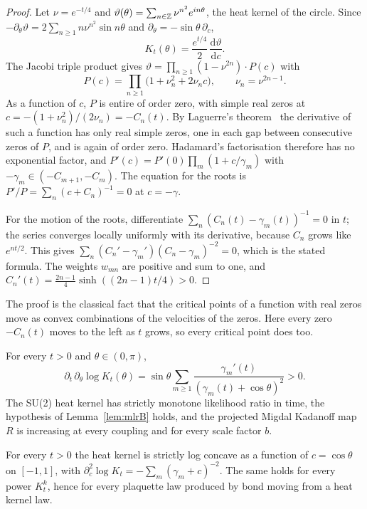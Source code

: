 \begin{proof}
Let $\nu=e^{-t/4}$ and $\vartheta(\theta)=\sum_{n\in\mathbb{Z}}\nu^{n^2}e^{in\theta}$, the heat kernel of the circle. Since $-\partial_\theta\vartheta=2\sum_{n\ge1}n\nu^{n^2}\sin n\theta$ and $\partial_\theta=-\sin\theta\,\partial_c$,
\[
K_t(\theta)=\frac{e^{t/4}}{2}\,\frac{\mathrm d\vartheta}{\mathrm dc}.
\]
The Jacobi triple product gives $\vartheta=\prod_{n\ge1}(1-\nu^{2n})\cdot P(c)$ with
\[
P(c)=\prod_{n\ge1}\big(1+\nu_n^2+2\nu_nc\big),\qquad \nu_n=\nu^{2n-1}.
\]
As a function of $c$, $P$ is entire of order zero, with simple real zeros at $c=-(1+\nu_n^2)/(2\nu_n)=-C_n(t)$. By Laguerre's theorem~\cite{PS14} the derivative of such a function has only real simple zeros, one in each gap between consecutive zeros of $P$, and is again of order zero. Hadamard's factorisation therefore has no exponential factor, and $P'(c)=P'(0)\prod_m(1+c/\gamma_m)$ with $-\gamma_m\in(-C_{m+1},-C_m)$. The equation for the roots is $P'/P=\sum_n(c+C_n)^{-1}=0$ at $c=-\gamma$.

For the motion of the roots, differentiate $\sum_n(C_n(t)-\gamma_m(t))^{-1}=0$ in $t$; the series converges locally uniformly with its derivative, because $C_n$ grows like $e^{nt/2}$. This gives $\sum_n(C_n'-\gamma_m')(C_n-\gamma_m)^{-2}=0$, which is the stated formula. The weights $w_{mn}$ are positive and sum to one, and $C_n'(t)=\frac{2n-1}{4}\sinh((2n-1)t/4)>0$.
\end{proof}

The proof is the classical fact that the critical points of a function with real zeros move as convex combinations of the velocities of the zeros. Here every zero $-C_n(t)$ moves to the left as $t$ grows, so every critical point does too.

\begin{corollary}\label{cor:mlrall}
For every $t>0$ and $\theta\in(0,\pi)$,
\[
\partial_t\,\partial_\theta\log K_t(\theta)=\sin\theta\sum_{m\ge1}\frac{\gamma_m'(t)}{(\gamma_m(t)+\cos\theta)^2}>0 .
\]
The SU(2) heat kernel has strictly monotone likelihood ratio in time, the hypothesis of Lemma~\ref{lem:mlrB} holds, and the projected Migdal Kadanoff map $R$ is increasing at every coupling and for every scale factor $b$.
\end{corollary}

\begin{corollary}\label{cor:logconc}
For every $t>0$ the heat kernel is strictly log concave as a function of $c=\cos\theta$ on $[-1,1]$, with $\partial_c^2\log K_t=-\sum_m(\gamma_m+c)^{-2}$. The same holds for every power $K_t^k$, hence for every plaquette law produced by bond moving from a heat kernel law.
\end{corollary}

